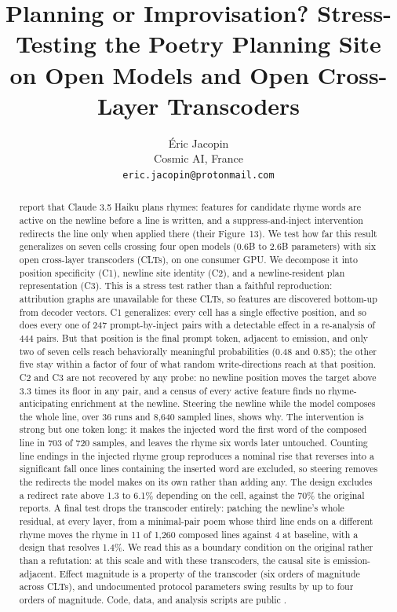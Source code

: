 \documentclass[11pt]{article}
\title{Planning or Improvisation? Stress-Testing the Poetry Planning Site\\ on Open Models and Open Cross-Layer Transcoders}
\author{\'{E}ric Jacopin \\
  Cosmic AI, France \\
  \texttt{eric.jacopin@protonmail.com}}
\begin{document}
\maketitle

\begin{abstract}
\citet{lindsey2025biology} report that Claude 3.5 Haiku plans rhymes: features for candidate rhyme words are active on the newline before a line is written, and a suppress-and-inject intervention redirects the line only when applied there (their Figure~13). We test how far this result generalizes on seven cells crossing four open models (0.6B to 2.6B parameters) with six open cross-layer transcoders (CLTs), on one consumer GPU. We decompose it into position specificity (C1), newline site identity (C2), and a newline-resident plan representation (C3). This is a stress test rather than a faithful reproduction: attribution graphs are unavailable for these CLTs, so features are discovered bottom-up from decoder vectors. C1 generalizes: every cell has a single effective position, and so does every one of 247 prompt-by-inject pairs with a detectable effect in a re-analysis of 444 pairs. But that position is the final prompt token, adjacent to emission, and only two of seven cells reach behaviorally meaningful probabilities (0.48 and 0.85); the other five stay within a factor of four of what random write-directions reach at that position. C2 and C3 are not recovered by any probe: no newline position moves the target above 3.3 times its floor in any pair, and a census of every active feature finds no rhyme-anticipating enrichment at the newline. Steering the newline while the model composes the whole line, over 36 runs and 8{,}640 sampled lines, shows why. The intervention is strong but one token long: it makes the injected word the first word of the composed line in 703 of 720 samples, and leaves the rhyme six words later untouched. Counting line endings in the injected rhyme group reproduces a nominal rise that reverses into a significant fall once lines containing the inserted word are excluded, so steering removes the redirects the model makes on its own rather than adding any. The design excludes a redirect rate above 1.3 to 6.1\% depending on the cell, against the 70\% the original reports. A final test drops the transcoder entirely: patching the newline's whole residual, at every layer, from a minimal-pair poem whose third line ends on a different rhyme moves the rhyme in 11 of 1{,}260 composed lines against 4 at baseline, with a design that resolves 1.4\%. We read this as a boundary condition on the original rather than a refutation: at this scale and with these transcoders, the causal site is emission-adjacent. Effect magnitude is a property of the transcoder (six orders of magnitude across CLTs), and undocumented protocol parameters swing results by up to four orders of magnitude. Code, data, and analysis scripts are public \citep{paperrepo2026}.
\end{abstract}
\end{document}
